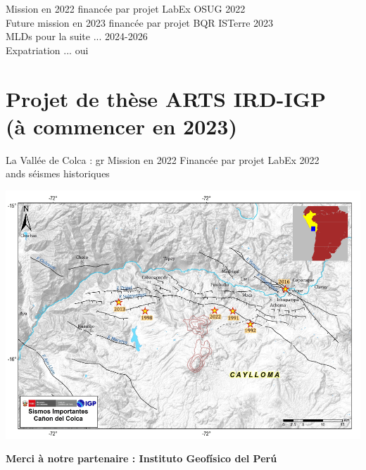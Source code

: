 \documentclass{beamer}
\begin{document}
\begin{frame}
\begin{center}
\begin{minipage}{0.3\linewidth}
  \end{minipage}
 \end{center}
 {\small
 Mission en 2022 financée par projet LabEx OSUG 2022 \\
 Future mission en 2023 financée par projet BQR ISTerre 2023 \\
 MLDs pour la suite ... 2024-2026 \\
 Expatriation ... oui
 }
 
 
\end{frame}




\section{Projet de thèse ARTS IRD-IGP \\ (à commencer en 2023)}

\begin{frame}
 {La Vallée de Colca : gr \centering Mission en 2022 Financée par projet LabEx 2022 \\
ands séismes historiques}

 \begin{center}
 \vskip -0.5cm  \includegraphics[width=0.9\linewidth]{images/red_colca_hist.png}  \\  
 \end{center}

 \hfill {\bf \small Merci à notre partenaire : Instituto Geofísico del Perú}

\end{frame}
\end{document}
